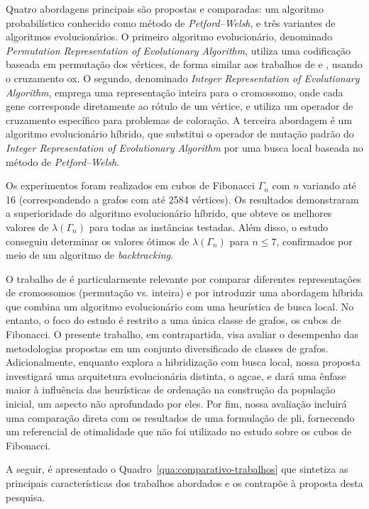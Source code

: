 Quatro abordagens principais são propostas e comparadas: um algoritmo probabilístico conhecido como método de \textit{Petford–Welsh}, e três variantes de algoritmos evolucionários. O primeiro algoritmo evolucionário, denominado \textit{Permutation Representation of Evolutionary Algorithm}, utiliza uma codificação baseada em permutação dos vértices, de forma similar aos trabalhos de  e , usando o cruzamento \gls{ox}. O segundo, denominado \textit{Integer Representation of Evolutionary Algorithm}, emprega uma representação inteira para o cromossomo, onde cada gene corresponde diretamente ao rótulo de um vértice, e utiliza um operador de cruzamento específico para problemas de coloração. A terceira abordagem é um algoritmo evolucionário híbrido, que substitui o operador de mutação padrão do \textit{Integer Representation of Evolutionary Algorithm} por uma busca local baseada no método de \textit{Petford–Welsh}.

Os experimentos foram realizados em cubos de Fibonacci $\Gamma_n$ com $n$ variando até 16 (correspondendo a grafos com até 2584 vértices). Os resultados demonstraram a superioridade do algoritmo evolucionário híbrido, que obteve os melhores valores de $\lambda(\Gamma_n)$ para todas as instâncias testadas. Além disso, o estudo conseguiu determinar os valores ótimos de $\lambda(\Gamma_n)$ para $n \leq 7$, confirmados por meio de um algoritmo de \textit{backtracking}.

O trabalho de  é particularmente relevante por comparar diferentes representações de cromossomos (permutação vs. inteira) e por introduzir uma abordagem híbrida que combina um algoritmo evolucionário com uma heurística de busca local. No entanto, o foco do estudo é restrito a uma única classe de grafos, os cubos de Fibonacci. O presente trabalho, em contrapartida, visa avaliar o desempenho das metodologias propostas em um conjunto diversificado de classes de grafos. Adicionalmente, enquanto  explora a hibridização com busca local, nossa proposta investigará uma arquitetura evolucionária distinta, o \gls{agcae}, e dará uma ênfase maior à influência das heurísticas de ordenação na construção da população inicial, um aspecto não aprofundado por eles. Por fim, nossa avaliação incluirá uma comparação direta com os resultados de uma formulação de \gls{pli}, fornecendo um referencial de otimalidade que não foi utilizado no estudo sobre os cubos de Fibonacci.


A seguir, é apresentado o Quadro~\ref{qua:comparativo-trabalhos} que sintetiza as principais características dos trabalhos abordados e os contrapõe à proposta desta pesquisa.

